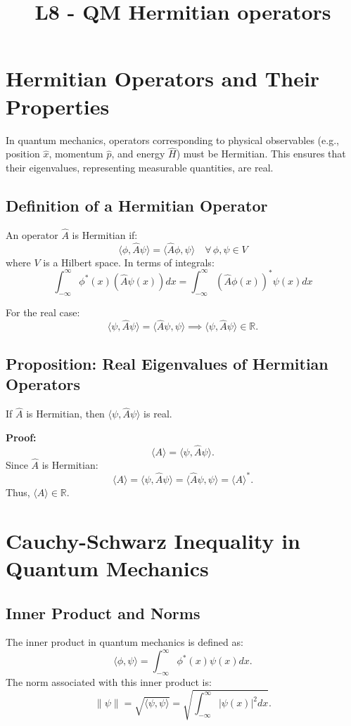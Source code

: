 \documentclass[a4paper,12pt]{article}
\begin{document}
\title{L8 - QM Hermitian operators}
\author{}
\date{}
\maketitle

\begin{multicols}{2}

\section*{Hermitian Operators and Their Properties}

In quantum mechanics, operators corresponding to physical observables (e.g., position $\hat{x}$, momentum $\hat{p}$, and energy $\hat{H}$) must be Hermitian. This ensures that their eigenvalues, representing measurable quantities, are real.

\subsection*{Definition of a Hermitian Operator}
An operator $\hat{A}$ is Hermitian if:
\[
\langle \phi, \hat{A} \psi \rangle = \langle \hat{A} \phi, \psi \rangle \quad \forall \, \phi, \psi \in V
\]
where $V$ is a Hilbert space. In terms of integrals:
\[
\int_{-\infty}^\infty \phi^*(x) (\hat{A} \psi(x)) dx = \int_{-\infty}^\infty (\hat{A} \phi(x))^* \psi(x) dx
\]

For the real case:
\[
\langle \psi, \hat{A} \psi \rangle = \langle \hat{A} \psi, \psi \rangle \implies \langle \psi, \hat{A} \psi \rangle \in \mathbb{R}.
\]

\subsection*{Proposition: Real Eigenvalues of Hermitian Operators}
If $\hat{A}$ is Hermitian, then $\langle \psi, \hat{A} \psi \rangle$ is real.

\textbf{Proof:}
\[
\langle A \rangle = \langle \psi, \hat{A} \psi \rangle.
\]
Since $\hat{A}$ is Hermitian:
\[
\langle A \rangle = \langle \psi, \hat{A} \psi \rangle = \langle \hat{A} \psi, \psi \rangle = \langle A \rangle^*.
\]
Thus, $\langle A \rangle \in \mathbb{R}$.

\section*{Cauchy-Schwarz Inequality in Quantum Mechanics}

\subsection*{Inner Product and Norms}
The inner product in quantum mechanics is defined as:
\[
\langle \phi, \psi \rangle = \int_{-\infty}^\infty \phi^*(x) \psi(x) dx.
\]
The norm associated with this inner product is:
\[
\|\psi\| = \sqrt{\langle \psi, \psi \rangle} = \sqrt{\int_{-\infty}^\infty |\psi(x)|^2 dx}.
\]


\end{multicols}
\end{document}
